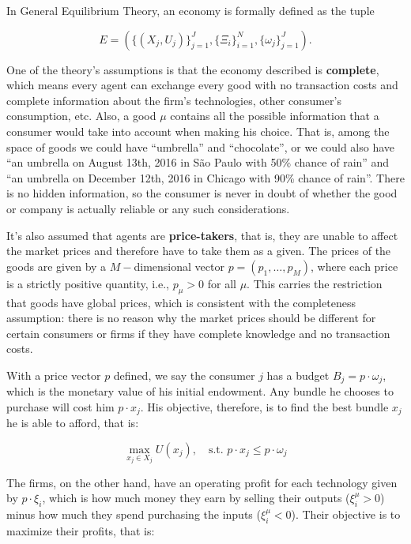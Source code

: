 In General Equilibrium Theory, an economy is formally defined as the tuple

\begin{equation}
  E = \left(\{(X_j,U_j)\}_{j=1}^J,
    \{\Xi_i\}_{i=1}^N, \{\omega_j\}_{j=1}^J \right).\label{eq:econGE}
\end{equation}

One of the theory's assumptions is that the economy described is \textbf{complete}, which means every agent can exchange every good with no transaction costs and complete information about the firm's technologies, other consumer's consumption, etc. Also, a good $\mu$ contains all the possible information that a consumer would take into account when making his choice. That is, among the space of goods we could have ``umbrella'' and ``chocolate'', or we could also have ``an umbrella on August 13th, 2016 in São Paulo with 50\% chance of rain'' and ``an umbrella on December 12th, 2016 in Chicago with 90\% chance of rain''. There is no hidden information, so the consumer is never in doubt of whether the good or company is actually reliable or any such considerations.

It's also assumed that agents are \textbf{price-takers}, that is, they are unable to affect the market prices and therefore have to take them as a given. The prices of the goods are given by a $M-$dimensional vector $p = (p_1, \ldots, p_M)$, where each price is a strictly positive quantity, i.e., $p_\mu>0$ for all $\mu$. This carries the restriction that goods have global prices, which is consistent with the completeness assumption: there is no reason why the market prices should be different for certain consumers or firms if they have complete knowledge and no transaction costs.

With a price vector $p$ defined, we say the consumer $j$ has a budget $B_j = p\cdot \omega_j$, which is the monetary value of his initial endowment. Any bundle he chooses to purchase will cost him $p\cdot x_j$. His objective, therefore, is to find the best bundle $x_j$ he is able to afford, that is:

\begin{equation}
  \label{eq:consumer_obj}
  \max_{x_j \in X_j} U(x_j), \quad \text{s.t. } p\cdot x_j \leq p\cdot \omega_j
\end{equation}

The firms, on the other hand, have an operating profit for each technology given by $p \cdot \xi_i$, which is how much money they earn by selling their outputs ($\xi_i^\mu > 0$) minus how much they spend purchasing the inputs ($\xi_i^\mu < 0$). Their objective is to maximize their profits, that is:

